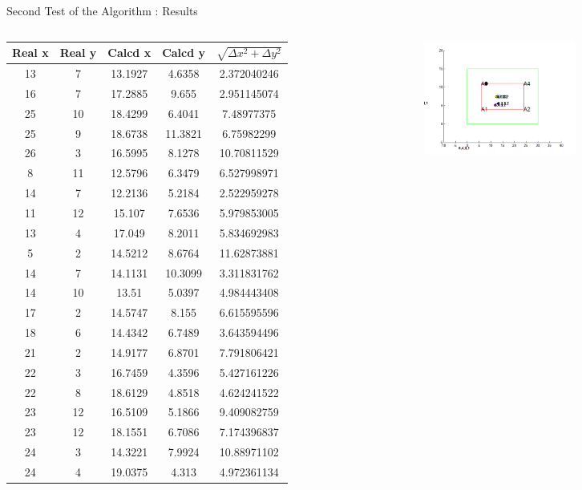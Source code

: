 \documentclass[utf8,compress]{beamer}
\begin{document}
\begin{frame}[containsverbatim]{Second Test of the Algorithm : Results  }
\begin{columns}
\begin{column}{0.5\textwidth}\tiny

\begin{tabular}{|c|c|c|c|c|}
\hline
	\textbf Real x & \textbf Real y & \textbf Calcd x & \textbf Calcd y &  $ \sqrt{\Delta x^2 + \Delta y^2} $ \\
\hline
\hline
13&	7&	13.1927&	4.6358&	2.372040246\\
16&	7&	17.2885&	9.655&	2.951145074\\
25&	10&	18.4299&	6.4041&	7.48977375\\
25&	9&	18.6738&	11.3821&	6.75982299\\
26&	3&	16.5995&	8.1278&	10.70811529\\
8&	11&	12.5796&	6.3479&	6.527998971\\
14&	7&	12.2136&	5.2184&	2.522959278\\
11&	12&	15.107&	7.6536&	5.979853005\\
13&	4&	17.049&	8.2011&	5.834692983\\
5&	2&	14.5212&	8.6764&	11.62873881\\
14&	7&	14.1131&	10.3099&	3.311831762\\
14&	10&	13.51&		5.0397&	4.984443408\\
17&	2&	14.5747&	8.155&	6.615595596\\
18&	6&	14.4342&	6.7489&	3.643594496\\
21&	2&	14.9177&	6.8701&	7.791806421\\
22&	3&	16.7459&	4.3596&	5.427161226\\
22&	8&	18.6129&	4.8518&	4.624241522\\
23&	12&	16.5109&	5.1866&	9.409082759\\
23&	12&	18.1551&	6.7086&	7.174396837\\
24&	3&	14.3221&	7.9924&	10.88971102\\
24&	4&	19.0375&	4.313&	4.972361134\\

\hline
\end{tabular}
\end{column}
\begin{column}{0.5\textwidth}
    \begin{figure}[h]
        \includegraphics[width=5cm]{t2cc_sur.png}
    \end{figure}
\end{column}

\end{columns}

\end{frame}
\end{document}
